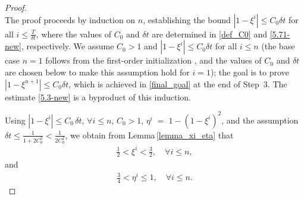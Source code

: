 \documentclass{article}
\theoremstyle{definition}                   %
\begin{document}
\begin{proof}
\mbox{}\\
The proof proceeds by induction on $n$, establishing the bound
$|1-\xi^i| \le C_0 \delta t$ for all $i\le \frac{T}{\delta t}$, where the
values of $C_0$ and $\delta t$ are determined in \eqref{def_C0} and
\eqref{5.71-new}, respectively. We assume $C_0>1$ and
$|1 - \xi^i| \le C_0 \delta t$ for all $i \le n$ (the base case $n=1$
follows from the first-order initialization \cite{guermond2003new}, and
the values of $C_0$ and $\delta t$ are chosen below to make this
assumption hold for $i=1$); the goal is to prove
$|1-\xi^{n+1}|\le C_0 \delta t$, which is achieved in \eqref{final_goal}
at the end of Step~3. The estimate \eqref{5.3-new} is a byproduct of
this induction.

Using $|1-\xi^{i}| \le C_0\,\delta t$, 
$\forall i\le n$, $C_0>1$, 
$\eta^{i} \;=\; 1-(1-\xi^{i})^{2}$, 
and the assumption $\delta t \le \frac{1}{1+2C_0^2}< \frac{1}{2C_0^2}$, 
we obtain from Lemma\,\ref{lemma_xi_eta} that 
\begin{align}
\tfrac{1}{2} < \xi^{i} < \tfrac{3}{2},  \quad \forall i\le n, 
\label{5.8-new}
\end{align}
and 
\begin{align}
\tfrac34 < \eta^{i} \le 1, \quad \forall i\le n.
\label{5.9-new}
\end{align}

\vskip 0.2cm


\end{proof}
\end{document}
